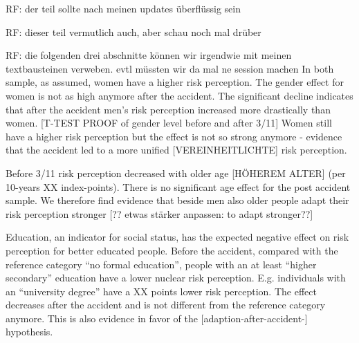 {%
RF: der teil sollte nach meinen updates überflüssig sein  


RF: dieser teil vermutlich auch, aber schau noch mal drüber


RF: die folgenden drei abschnitte können wir irgendwie mit meinen textbausteinen verweben. evtl müssten wir da mal ne session machen
In both sample, as assumed, women have a higher risk perception. The gender effect for women is not as high anymore after the accident. The significant decline indicates that after the accident men's risk perception increased more drastically than women. [T-TEST PROOF of gender level before and after 3/11] Women still have a higher risk perception but the effect is not so strong anymore - evidence that the accident led to a more unified [VEREINHEITLICHTE] risk perception.  

Before 3/11 risk perception decreased with older age [HÖHEREM ALTER] (per 10-years XX index-points). There is no significant age effect for the post accident sample. We therefore find evidence that beside men also older people adapt their risk perception stronger [?? etwas stärker anpassen: to adapt stronger??]   


Education, an indicator for social status, has the expected negative effect on risk perception for better educated people. Before the accident, compared with the reference category ``no formal education'', people with an at least ``higher secondary''  education have a lower nuclear risk perception. E.g. individuals with an ``university degree'' have a XX points lower risk perception. The effect decreases after the accident and is not different from the reference category anymore. This is also evidence in favor of the [adaption-after-accident-] hypothesis.


}
